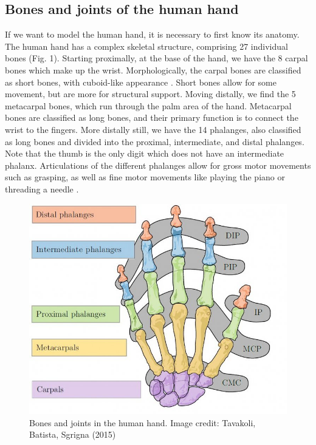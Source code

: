 \documentclass{article}
\begin{document}
\subsection{Bones and joints of the human hand}

If we want to model the human hand, it is necessary to first know its anatomy. The human hand has a complex skeletal structure, comprising 27 individual bones \citep{panchal2013skeletal} (Fig. 1). Starting proximally, at the base of the hand, we have the 8 carpal bones which make up the wrist. Morphologically, the carpal bones are classified as short bones, with cuboid-like appearance \citep{openStax_bones}. Short bones allow for some movement, but are more for structural support. Moving distally, we find the 5 metacarpal bones, which run through the palm area of the hand. Metacarpal bones are classified as long bones, and their primary function is to connect the wrist to the fingers. More distally still, we have the 14 phalanges, also classified as long bones and divided into the proximal, intermediate, and distal phalanges. Note that the thumb is the only digit which does not have an intermediate phalanx. Articulations of the different phalanges allow for gross motor movements such as grasping, as well as fine motor movements like playing the piano or threading a needle \citep{duncan2013biomechanics}.

\begin{figure}[!htbp]
\centering
\includegraphics[width=0.6\linewidth]{files/EPpXta8zJdzN048lz8AR-c0f7102765d12d6a28f615efc2b5b74d.png}
\caption[]{Bones and joints in the human hand. Image credit: Tavakoli, Batista, Sgrigna (2015) \cite{Tavakoli_2015}}
\label{Q9rw6fWrIJ}
\end{figure}
\end{document}
